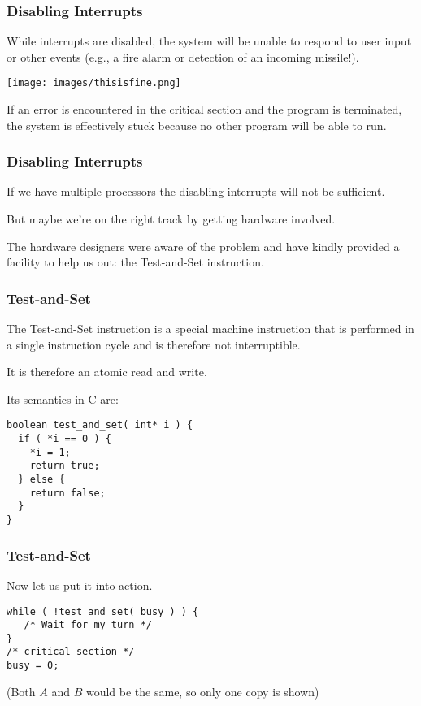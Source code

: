 \begin{frame}
	\frametitle{Disabling Interrupts}

	While interrupts are disabled, the system will be unable to respond to user input or other events (e.g., a fire alarm or detection of an incoming missile!).

	\begin{center}
		\texttt{[image: images/thisisfine.png]}
	\end{center}

	If an error is encountered in the critical section and the program is terminated, the system is effectively stuck because no other program will be able to run.


\end{frame}

\begin{frame}
	\frametitle{Disabling Interrupts}

	If we have multiple processors the disabling interrupts will not be sufficient.

	But maybe we're on the right track by getting hardware involved.


	The hardware designers were aware of the problem and have kindly provided a facility to help us out: the \alert{Test-and-Set} instruction.


\end{frame}

\begin{frame}[fragile]
	\frametitle{Test-and-Set}

	The Test-and-Set instruction is a special machine instruction that is performed in a single instruction cycle and is therefore not interruptible.

	It is therefore an atomic read and write.

	Its semantics in C are:

	\begin{verbatim}
boolean test_and_set( int* i ) {
  if ( *i == 0 ) {
    *i = 1;
    return true;
  } else {
    return false;
  }
}
\end{verbatim}

\end{frame}

\begin{frame}[fragile]
	\frametitle{Test-and-Set}

	Now let us put it into action.

	\begin{verbatim}
while ( !test_and_set( busy ) ) {
   /* Wait for my turn */
}
/* critical section */
busy = 0;
\end{verbatim}


	(Both $A$ and $B$ would be the same, so only one copy is shown)


\end{frame}

